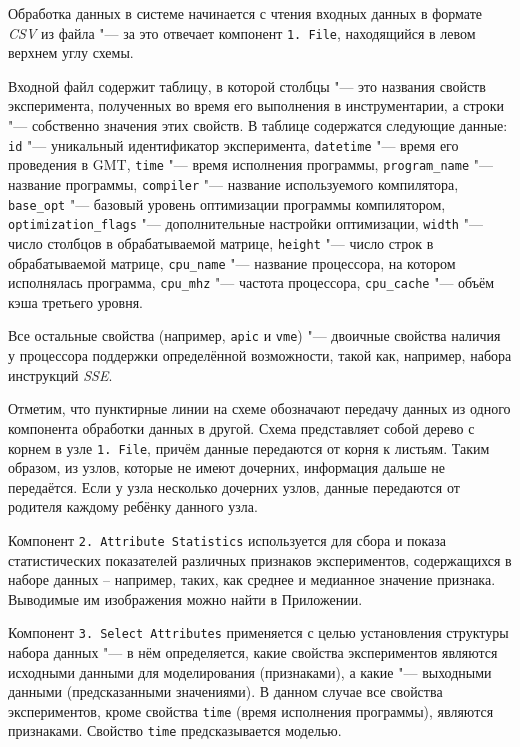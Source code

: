 Обработка данных в системе начинается с чтения входных данных в формате \textit{CSV} из файла "--- за это отвечает компонент \texttt{1.\,File}, находящийся в левом верхнем углу схемы.

Входной файл содержит таблицу, в которой столбцы "--- это названия свойств эксперимента, полученных во время его выполнения в инструментарии, а строки "--- собственно значения этих свойств. В таблице содержатся следующие данные: \texttt{id} "--- уникальный идентификатор эксперимента, \texttt{datetime} "--- время его проведения в GMT, \texttt{time} "--- время исполнения программы,  \texttt{program\_name} "--- название программы, \texttt{compiler} "--- название используемого компилятора, \texttt{base\_opt} "--- базовый уровень оптимизации программы компилятором, \texttt{optimization\_flags}  "--- дополнительные настройки оптимизации, \texttt{width} "--- число столбцов в обрабатываемой матрице, \texttt{height} "--- число строк в обрабатываемой матрице, \texttt{cpu\_name} "--- название процессора, на котором исполнялась программа, \texttt{cpu\_mhz} "--- частота процессора, \texttt{cpu\_cache} "--- объём кэша третьего уровня.

Все остальные свойства (например, \texttt{apic} и \texttt{vme}) "--- двоичные свойства наличия у процессора поддержки определённой возможности, такой как, например, набора инструкций \textit{SSE}.

Отметим, что пунктирные линии на схеме обозначают передачу данных из одного компонента обработки данных в другой. Схема представляет собой дерево с корнем в узле \texttt{1.\,File}, причём данные передаются от корня к листьям. Таким образом, из узлов, которые не имеют дочерних, информация дальше не передаётся. Если у узла несколько дочерних узлов, данные передаются от родителя каждому ребёнку данного узла.

Компонент \texttt{2.\,Attribute~Statistics} используется для сбора и показа статистических показателей различных признаков экспериментов, содержащихся в наборе данных -- например, таких, как среднее и медианное значение признака. Выводимые им изображения можно найти в Приложении.

Компонент \texttt{3.\,Select~Attributes} применяется с целью установления структуры набора данных "--- в нём определяется, какие свойства экспериментов являются исходными данными для моделирования (признаками), а какие "--- выходными данными (предсказанными значениями). В данном случае все свойства экспериментов, кроме свойства \texttt{time} (время исполнения программы), являются признаками. Свойство \texttt{time} предсказывается моделью.

